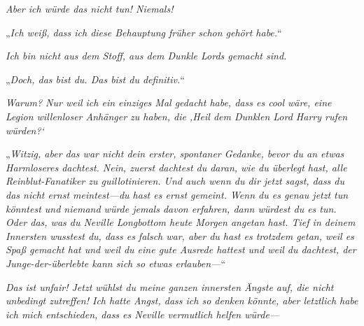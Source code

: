 \emph{Aber ich würde das nicht tun! Niemals! }

„\emph{Ich weiß, dass ich diese Behauptung früher schon gehört habe.}“

\emph{Ich bin nicht aus dem Stoff, aus dem Dunkle Lords gemacht sind. }

„\emph{Doch, das bist du. Das bist du \emph{definitiv}.}“

\emph{Warum? Nur weil ich \emph{ein einziges} Mal gedacht habe, dass es cool wäre, eine Legion willenloser Anhänger zu haben, die ‚Heil dem Dunklen Lord Harry rufen würden?‘}

„\emph{Witzig, aber das war nicht dein erster, spontaner Gedanke, bevor du an etwas Harmloseres dachtest. Nein, zuerst dachtest du daran, wie du überlegt hast, alle Reinblut-Fanatiker zu guillotinieren. Und auch wenn du dir jetzt sagst, dass du das nicht ernst meintest—du hast es ernst gemeint. Wenn du es genau jetzt tun könntest und niemand würde jemals davon erfahren, dann würdest du es tun. Oder das, was du Neville Longbottom heute Morgen angetan hast. Tief in deinem Innersten \emph{wusstest} du, dass es falsch war, aber du hast es \emph{trotzdem} getan, weil es \emph{Spaß} gemacht hat und weil du eine \emph{gute Ausrede} hattest und weil du dachtest, der Junge-der-überlebte kann sich so etwas erlauben—}“

\emph{Das ist unfair! Jetzt wühlst du meine ganzen innersten Ängste auf, die nicht unbedingt zutreffen! Ich \emph{hatte Angst}, dass ich so denken \emph{könnte}, aber letztlich habe ich mich entschieden, dass es Neville vermutlich \emph{helfen} würde—}

